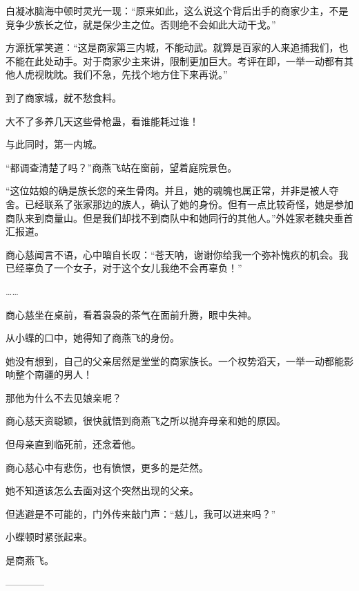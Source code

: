 \begin{this_body}
白凝冰脑海中顿时灵光一现：“原来如此，这么说这个背后出手的商家少主，不是竞争少族长之位，就是保少主之位。否则绝不会如此大动干戈。”

方源抚掌笑道：“这是商家第三内城，不能动武。就算是百家的人来追捕我们，也不能在此处动手。对于商家少主来讲，限制更加巨大。考评在即，一举一动都有其他人虎视眈眈。我们不急，先找个地方住下来再说。”

到了商家城，就不愁食料。

大不了多养几天这些骨枪蛊，看谁能耗过谁！

与此同时，第一内城。

“都调查清楚了吗？”商燕飞站在窗前，望着庭院景色。

“这位姑娘的确是族长您的亲生骨肉。并且，她的魂魄也属正常，并非是被人夺舍。已经联系了张家那边的族人，确认了她的身份。但有一点比较奇怪，她是参加商队来到商量山。但是我们却找不到商队中和她同行的其他人。”外姓家老魏央垂首汇报道。

商心慈闻言不语，心中暗自长叹：“苍天呐，谢谢你给我一个弥补愧疚的机会。我已经辜负了一个女子，对于这个女儿我绝不会再辜负！”

……

商心慈坐在桌前，看着袅袅的茶气在面前升腾，眼中失神。

从小蝶的口中，她得知了商燕飞的身份。

她没有想到，自己的父亲居然是堂堂的商家族长。一个权势滔天，一举一动都能影响整个南疆的男人！

那他为什么不去见娘亲呢？

商心慈天资聪颖，很快就悟到商燕飞之所以抛弃母亲和她的原因。

但母亲直到临死前，还念着他。

商心慈心中有悲伤，也有愤恨，更多的是茫然。

她不知道该怎么去面对这个突然出现的父亲。

但逃避是不可能的，门外传来敲门声：“慈儿，我可以进来吗？”

小蝶顿时紧张起来。

是商燕飞。

------------

\end{this_body}


